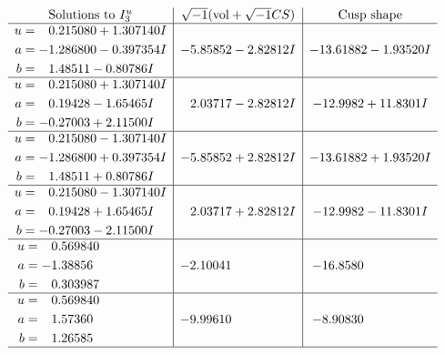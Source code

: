 \documentclass[1p]{elsarticle_modified}
\theoremstyle{definition}
\newcommand{\I}{\sqrt{-1}}
\begin{document}
$$\begin{array}{c|c|c}  
\text{Solutions to }I^u_{3}& \I (\text{vol} + \sqrt{-1}CS) & \text{Cusp shape}\\
 \hline 
\begin{aligned}
u &= \phantom{-}0.215080 + 1.307140 I \\
a &= -1.286800 - 0.397354 I \\
b &= \phantom{-}1.48511 - 0.80786 I\end{aligned}
 & -5.85852 - 2.82812 I & -13.61882 - 1.93520 I \\ \hline\begin{aligned}
u &= \phantom{-}0.215080 + 1.307140 I \\
a &= \phantom{-}0.19428 - 1.65465 I \\
b &= -0.27003 + 2.11500 I\end{aligned}
 & \phantom{-}2.03717 - 2.82812 I & -12.9982 + 11.8301 I \\ \hline\begin{aligned}
u &= \phantom{-}0.215080 - 1.307140 I \\
a &= -1.286800 + 0.397354 I \\
b &= \phantom{-}1.48511 + 0.80786 I\end{aligned}
 & -5.85852 + 2.82812 I & -13.61882 + 1.93520 I \\ \hline\begin{aligned}
u &= \phantom{-}0.215080 - 1.307140 I \\
a &= \phantom{-}0.19428 + 1.65465 I \\
b &= -0.27003 - 2.11500 I\end{aligned}
 & \phantom{-}2.03717 + 2.82812 I & -12.9982 - 11.8301 I \\ \hline\begin{aligned}
u &= \phantom{-}0.569840\phantom{ +0.000000I} \\
a &= -1.38856\phantom{ +0.000000I} \\
b &= \phantom{-}0.303987\phantom{ +0.000000I}\end{aligned}
 & -2.10041\phantom{ +0.000000I} & -16.8580\phantom{ +0.000000I} \\ \hline\begin{aligned}
u &= \phantom{-}0.569840\phantom{ +0.000000I} \\
a &= \phantom{-}1.57360\phantom{ +0.000000I} \\
b &= \phantom{-}1.26585\phantom{ +0.000000I}\end{aligned}
 & -9.99610\phantom{ +0.000000I} & -8.90830\phantom{ +0.000000I}\\
 \hline 
 \end{array}$$\newpage\newpage\renewcommand{\arraystretch}{1}
\end{document}
